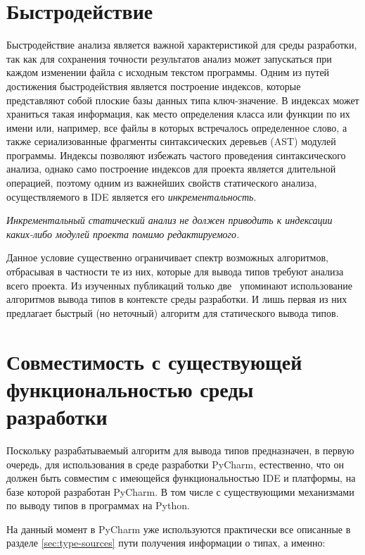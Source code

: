 \section{Быстродействие}
\label{sec:performance-requirement}

Быстродействие анализа является важной характеристикой для среды разработки, так
как для сохранения точности результатов анализ может запускаться
при каждом изменении файла с исходным текстом программы. Одним из путей
достижения быстродействия является построение индексов, которые представляют
собой плоские базы данных типа ключ-значение. В индексах может храниться такая
информация, как место определения класса или функции по их имени или,
например, все файлы в которых встречалось определенное слово, а также
сериализованные фрагменты синтаксических деревьев (AST) модулей программы. Индексы
позволяют избежать частого проведения синтаксического анализа, однако само
построение индексов для проекта является длительной операцией, поэтому одним из
важнейших свойств статического анализа, осуществляемого в IDE является его
\emph{инкрементальность}.


\emph{Инкрементальный статический анализ не должен приводить к индексации 
 каких-либо модулей проекта помимо редактируемого.}

Данное условие существенно ограничивает спектр возможных алгоритмов, отбрасывая
в частности те из них, которые для вывода типов требуют анализа всего проекта. Из
 изученных публикаций только две~\cite{Pluquet2009,Haupt2011} упоминают
использование алгоритмов вывода типов в контексте среды разработки. И лишь
первая из них предлагает быстрый (но неточный) алгоритм для статического вывода типов.

\section{Совместимость с существующей функциональностью среды разработки}
\label{sec:compatibility-requirement}

Поскольку разрабатываемый алгоритм для вывода типов предназначен, в первую
очередь, для использования в среде разработки PyCharm, естественно, что он должен
быть совместим с имеющейся функциональностью IDE и платформы, на базе которой
разработан PyCharm. В том числе с существующими механизмами по выводу типов в
программах на Python. 

На данный момент в PyCharm уже используются практически все описанные в разделе
\ref{sec:type-sources} пути получения информации о типах, а именно:

